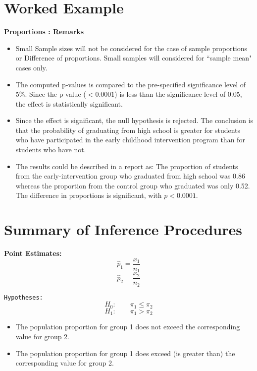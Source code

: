 \documentclass[]{report}
\begin{document}
\section{Worked Example}




\textbf{Proportions : Remarks}
\begin{itemize}
\item Small Sample sizes will not be considered for the case of sample proportions or Difference of proportions. Small samples will considered for ``sample mean" cases only.
\end{itemize}


\begin{itemize}
\item The computed p-values is compared to the pre-specified significance level of 5\%. Since the p-value ($<0.0001$) is less than the significance level of 0.05, the effect is statistically significant. 

\item Since the effect is significant, the null hypothesis is rejected. The conclusion is that the probability of graduating from high school is greater for students who have participated in the early childhood intervention program than for students who have not. 

\item The results could be described in a report as:
The proportion of students from the early-intervention group who graduated from high school was 0.86 whereas the proportion from the control group who graduated was only 0.52. The difference in proportions is significant, with $p < 0.0001$.
\end{itemize}




\section{Summary of Inference Procedures}
\textbf{Point Estimates:}
\[\hat{p}_1 = \frac{x_1}{n_1}  \]
\[\hat{p}_2 = \frac{x_2}{n_2}  \]

\texttt{Hypotheses:}
\[H_0 : \qquad \pi_1 \leq \pi_2   \]
\[H_1 : \qquad \pi_1 > \pi_2   \]

\begin{itemize}
\item The population proportion for group 1 does not exceed the corresponding value for group 2. 
\item The population proportion for group 1 does exceed (is greater than) the corresponding value for group 2.
\end{itemize}
\end{document}

